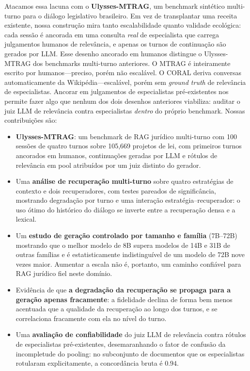 \documentclass[conference]{IEEEtran}
\begin{document}
Atacamos essa lacuna com o \textbf{Ulysses-MTRAG}, um benchmark sintético
multi-turno para o diálogo legislativo brasileiro. Em vez de transplantar uma
receita existente, nossa construção mira tanto escalabilidade quanto validade
ecológica: cada sessão é ancorada em uma consulta \emph{real} de especialista que
carrega julgamentos humanos de relevância, e apenas os turnos de continuação são
gerados por LLM. Esse desenho ancorado em humanos distingue o Ulysses-MTRAG dos
benchmarks multi-turno anteriores. O MTRAG \cite{Katsis2025MTRAG} é inteiramente
escrito por humanos---preciso, porém não escalável. O CORAL
\cite{Cheng2025CORAL} deriva conversas automaticamente da Wikipédia---escalável,
porém sem \emph{ground truth} de relevância de especialistas. Ancorar em
julgamentos de especialistas pré-existentes nos permite fazer algo que nenhum
dos dois desenhos anteriores viabiliza: auditar o juiz LLM de relevância contra
especialistas \emph{dentro} do próprio benchmark. Nossas contribuições são:
\begin{itemize}
  \item \textbf{Ulysses-MTRAG}: um benchmark de RAG jurídico multi-turno com 100
  sessões de quatro turnos sobre 105{,}669 projetos de lei, com primeiros turnos
  ancorados em humanos, continuações geradas por LLM e rótulos de relevância em
  pool atribuídos por um juiz distinto do gerador.
  \item Uma \textbf{análise de recuperação multi-turno} sobre quatro estratégias
  de contexto e dois recuperadores, com testes pareados de significância,
  mostrando degradação por turno e uma interação estratégia--recuperador: o uso
  ótimo do histórico do diálogo se inverte entre a recuperação densa e a
  lexical.
  \item Um \textbf{estudo de geração controlado por tamanho e família}
  (7B--72B) mostrando que o melhor modelo de 8B supera modelos de 14B e 31B de
  outras famílias e é estatisticamente indistinguível de um modelo de 72B nove
  vezes maior. Aumentar a escala não é, portanto, um caminho confiável para RAG
  jurídico fiel neste domínio.
  \item Evidência de que \textbf{a degradação da recuperação se propaga para a
  geração apenas fracamente}: a fidelidade declina de forma bem menos acentuada
  que a qualidade da recuperação ao longo dos turnos, e se correlaciona
  fracamente com ela no nível do turno.
  \item Uma \textbf{avaliação de confiabilidade} do juiz LLM de relevância
  contra rótulos de especialistas pré-existentes, desemaranhando o fator de
  confusão da incompletude do pooling: no subconjunto de documentos que os
  especialistas rotularam explicitamente, a concordância bruta é $0.94$.
\end{itemize}
\end{document}

